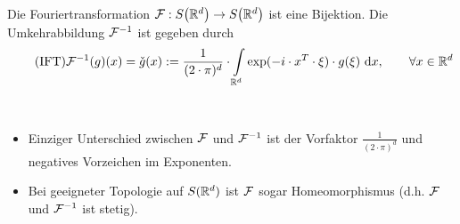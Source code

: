 \begin{theorem}\label{theorem7.4InversionDerFourierTransformation}\enter
Die Fouriertransformation $\mathcal{F}:S\big(\mathbb{R}^d\big)\to S\big(\mathbb{R}^d\big)$ ist eine Bijektion. Die Umkehrabbildung $\mathcal{F}^{-1}$ ist gegeben durch
\begin{align}\label{eqTheorem7.4}\tag{IFT}
\mathcal{F}^{-1}(g)(x)=\check{g}(x):=\frac{1}{(2\cdot\pi)^d}\cdot\int\limits_{\mathbb{R}^d}\exp(-i\cdot x^T\cdot\xi)\cdot g(\xi)\text{ d} x,\qquad\forall x\in\mathbb{R}^d
\end{align}
\end{theorem}

\begin{bemerkung}\
\begin{itemize}
\item Einziger Unterschied zwischen $\mathcal{F}$ und $\mathcal{F}^{-1}$ ist der Vorfaktor $\frac{1}{(2\cdot\pi)^d}$ und negatives Vorzeichen im Exponenten.
\item Bei geeigneter Topologie auf $S(\mathbb{R}^d)$ ist $\mathcal{F}$ sogar Homeomorphismus (d.h. $\mathcal{F}$ und $\mathcal{F}^{-1}$ ist stetig).
\end{itemize}
\end{bemerkung}

